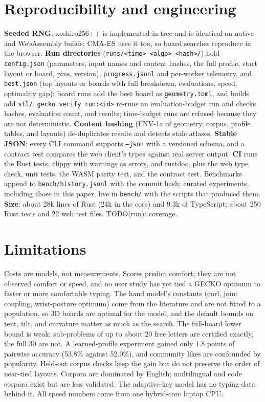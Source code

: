 \documentclass{gecko-paper}
\begin{document}
\begin{paperbody}
\section{Reproducibility and engineering}\label{sec:repro}
\textbf{Seeded RNG.} xoshiro256++ is implemented in-tree and is identical on native and WebAssembly builds; CMA-ES uses it too, so board searches reproduce in the browser. \textbf{Run directories} (\texttt{runs/<time>-<algo>-<hash>/}) hold \texttt{config.json} (parameters, input names and content hashes, the full profile, start layout or board, pins, version), \texttt{progress.jsonl} and per-worker telemetry, and \texttt{best.json} (top layouts or boards with full breakdown, evaluations, speed, optimality gap); board runs add the best board as \texttt{geometry.toml}, and builds add \texttt{stl/}. \texttt{gecko verify run:<id>} re-runs an evaluation-budget run and checks hashes, evaluation count, and results; time-budget runs are refused because they are not deterministic. \textbf{Content hashing} (FNV-1a of geometry, corpus, profile tables, and layouts) de-duplicates results and detects stale atlases. \textbf{Stable JSON}: every CLI command supports \texttt{--json} with a versioned schema, and a contract test compares the web client's types against real server output. \textbf{CI} runs the Rust tests, clippy with warnings as errors, and rustdoc, plus the web type check, unit tests, the WASM parity test, and the contract test. Benchmarks append to \texttt{bench/history.jsonl} with the commit hash; curated experiments, including those in this paper, live in \texttt{bench/} with the scripts that produced them. \textbf{Size}: about 28k lines of Rust (24k in the core) and 9.3k of TypeScript; about 250 Rust tests and 22 web test files. TODO(run): coverage.

\section{Limitations}
Costs are models, not measurements. Scores predict comfort; they are not observed comfort or speed, and no user study has yet tied a GECKO optimum to faster or more comfortable typing. The hand model's constants (curl, joint coupling, wrist-posture optimum) come from the literature and are not fitted to a population, so 3D boards are optimal for the model, and the default bounds on tent, tilt, and curvature matter as much as the search. The full-board lower bound is weak; sub-problems of up to about 20 free letters are certified exactly, the full 30 are not. A learned-profile experiment gained only 1.8 points of pairwise accuracy (53.8\% against 52.0\%), and community likes are confounded by popularity. Held-out corpus checks keep the gain but do not preserve the order of near-tied layouts. Corpora are dominated by English; multilingual and code corpora exist but are less validated. The adaptive-key model has no typing data behind it. All speed numbers come from one hybrid-core laptop CPU.


\end{paperbody}
\end{document}
